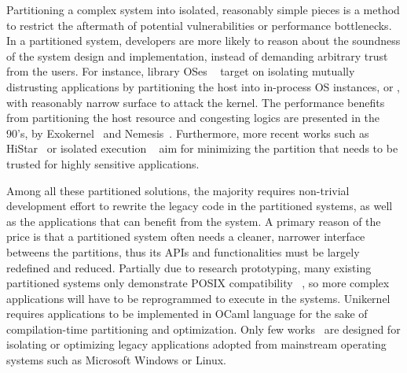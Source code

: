 Partitioning a complex system into
isolated, reasonably simple pieces
is a method
to restrict the aftermath of potential vulnerabilities or
performance bottlenecks.
In a partitioned system, developers are more likely to reason about
the soundness of the system design and implementation,
instead of demanding arbitrary trust from the users.
For instance, library OSes
~\citep{porter11drawbridge, baumann13bascule, unikernels}
target on isolating mutually distrusting applications
by partitioning the host into in-process OS instances,
or \emph{\picoprocs{}},
with reasonably narrow surface to attack the kernel.
The performance benefits
from partitioning the host resource and congesting logics
are presented in the 90's,
by Exokernel~\citep{engler95exokernel}
and Nemesis~\citep{leslie96nemesis}.
Furthermore, more recent works such as HiStar~\citep{zeldovich+histar}
or isolated execution
~\citep{flicker, trustzone, intelsgx, criswell2014virtualghost}
aim for minimizing the partition that needs to be trusted
for highly sensitive applications.



Among all these partitioned solutions,
the majority requires non-trivial development effort to 
rewrite the legacy code in the partitioned systems,
as well as the applications that can benefit from the system.
A primary reason of the price
is that a partitioned system
often needs a cleaner, narrower interface betweens the partitions,
thus its APIs and functionalities
must be largely redefined and reduced.
Partially due to research prototyping,
many existing partitioned systems only demonstrate POSIX compatibility
~\citep{engler95exokernel, leslie96nemesis, zeldovich+histar},
so more complex applications
will have to be reprogrammed to execute in the systems.
Unikernel~\citep{unikernels} requires applications to be implemented
in OCaml language for the sake of compilation-time
partitioning and optimization.
Only few works~\citep{porter11drawbridge, baumann13bascule, tsai14graphene}
are designed for isolating or optimizing
legacy applications adopted from mainstream operating systems such as Microsoft Windows or Linux.



